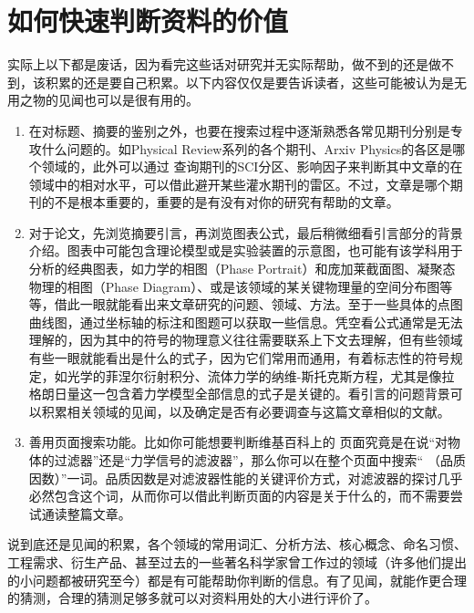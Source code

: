 \documentclass[a4paper,10pt,english]{sphinxmanual}
\begin{document}
\section{如何快速判断资料的价值}
\label{\detokenize{4. GetInfo:id4}}
实际上以下都是废话，因为看完这些话对研究并无实际帮助，做不到的还是做不到，该积累的还是要自己积累。以下内容仅仅是要告诉读者，这些可能被认为是无用之物的见闻也可以是很有用的。
\begin{enumerate}
\item {} 
在对标题、摘要的鉴别之外，也要在搜索过程中逐渐熟悉各常见期刊分别是专攻什么问题的。如Physical Review系列的各个期刊、Arxiv Physics的各区是哪个领域的，此外可以通过  查询期刊的SCI分区、影响因子来判断其中文章的在领域中的相对水平，可以借此避开某些灌水期刊的雷区。不过，文章是哪个期刊的不是根本重要的，重要的是有没有对你的研究有帮助的文章。

\item {} 
对于论文，先浏览摘要引言，再浏览图表公式，最后稍微细看引言部分的背景介绍。图表中可能包含理论模型或是实验装置的示意图，也可能有该学科用于分析的经典图表，如力学的相图（Phase Portrait）和庞加莱截面图、凝聚态物理的相图（Phase Diagram）、或是该领域的某关键物理量的空间分布图等等，借此一眼就能看出来文章研究的问题、领域、方法。至于一些具体的点图曲线图，通过坐标轴的标注和图题可以获取一些信息。凭空看公式通常是无法理解的，因为其中的符号的物理意义往往需要联系上下文去理解，但有些领域有些一眼就能看出是什么的式子，因为它们常用而通用，有着标志性的符号规定，如光学的菲涅尔衍射积分、流体力学的纳维-斯托克斯方程，尤其是像拉格朗日量这一包含着力学模型全部信息的式子是关键的。看引言的问题背景可以积累相关领域的见闻，以及确定是否有必要调查与这篇文章相似的文献。

\item {} 
善用页面搜索功能。比如你可能想要判断维基百科上的  页面究竟是在说“对物体的过滤器”还是“力学信号的滤波器”，那么你可以在整个页面中搜索“  （品质因数）”一词。品质因数是对滤波器性能的关键评价方式，对滤波器的探讨几乎必然包含这个词，从而你可以借此判断页面的内容是关于什么的，而不需要尝试通读整篇文章。

\end{enumerate}

说到底还是见闻的积累，各个领域的常用词汇、分析方法、核心概念、命名习惯、工程需求、衍生产品、甚至过去的一些著名科学家曾工作过的领域（许多他们提出的小问题都被研究至今）都是有可能帮助你判断的信息。有了见闻，就能作更合理的猜测，合理的猜测足够多就可以对资料用处的大小进行评价了。
\end{document}
